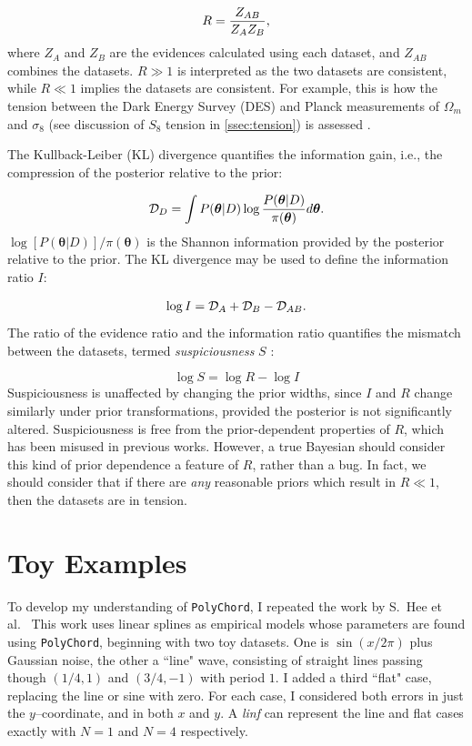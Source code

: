 \documentclass{article}
\begin{document}
\begin{equation}
  R = \frac{Z_{AB}}{Z_A Z_B} \textrm,
\end{equation}
%
where $Z_A$ and $Z_B$ are the evidences calculated using each dataset, and $Z_{AB}$ combines the datasets. $R\gg1$ is interpreted as the two datasets are consistent, while $R\ll1$ implies the datasets are consistent. For example, this is how the tension between the Dark Energy Survey (DES) and Planck measurements of $\Omega_m$ and $\sigma_8$ (see discussion of $S_8$ tension in \ref{ssec:tension}) is assessed \cite{suspiciousness}. 

The Kullback-Leiber (KL) divergence quantifies the information gain, i.e., the compression of the posterior relative to the prior:

\begin{equation}
  \mathcal D_D = \int P(\bm\theta | D) \log{\frac{P(\bm\theta | D)}{\pi(\bm\theta)}}d\bm\theta \textrm.
\end{equation}
%
$\log{[P(\bm\theta | D)]/\pi(\bm\theta)}$ is the Shannon information \cite{shannon} provided by the posterior relative to the prior. The KL divergence may be used to define the information ratio $I$:

\begin{equation}
  \log{I} = \mathcal D_A + \mathcal D_B - \mathcal D_{AB} \textrm.
\end{equation}
%
The ratio of the evidence ratio and the information ratio quantifies the mismatch between the datasets, termed \textit{suspiciousness} $S$ \cite{suspiciousness}:

\begin{equation}
  \log{S} = \log{R} - \log{I}
\end{equation}
%
 Suspiciousness is unaffected by changing the prior widths, since $I$ and $R$ change similarly under prior transformations, provided the posterior is not significantly altered. Suspiciousness is free from the prior-dependent properties of $R$, which has been misused in previous works. However, a true Bayesian should consider this kind of prior dependence a feature of $R$, rather than a bug. In fact, we should consider that if there are \textit{any} reasonable priors which result in $R\ll1$, then the datasets are in tension.

\section{Toy Examples}
\label{toyexamples}
To develop my understanding of \texttt{PolyChord}, I repeated the work by S.~Hee et al.\ \cite{Sonke} This work uses linear splines as empirical models whose parameters are found using \texttt{PolyChord}, beginning with two toy datasets. One is $\sin\left({x/2\pi}\right)$ plus Gaussian noise, the other a ``line" wave, consisting of straight lines passing though $(1/4, 1)$ and $(3/4, -1)$ with period $1$. I added a third ``flat" case, replacing the line or sine with zero. For each case, I considered both errors in just the $y$--coordinate, and in both $x$ and $y$. A \textit{linf} can represent the line and flat cases exactly with $N=1$ and $N=4$ respectively.
\end{document}
